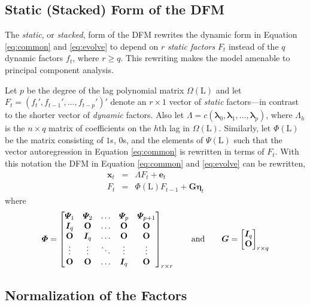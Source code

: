 \documentclass[12pt,twoside]{reedthesis}
\begin{document}
\hypertarget{static-stacked-form-of-the-dfm}{%
\subsection{Static (Stacked) Form of the DFM}\label{static-stacked-form-of-the-dfm}}

The \emph{static}, or \emph{stacked}, form of the DFM rewrites the dynamic form in Equation \eqref{eq:common} and \eqref{eq:evolve} to depend on \(r\) \emph{static factors} \(F_{t}\) instead of the \(q\) dynamic factors \(f_{t}\), where \(r \geq q\). This rewriting makes the model amenable to principal component analysis.

Let \(p\) be the degree of the lag polynomial matrix \(\bm \varOmega(\ensuremath{\mathrm{L}})\) and let \(F_{t} = (f_{t}', f_{t - 1}', \ldots, f_{t - p}')'\) denote an \(r \times 1\) vector of \emph{static} factors---in contrast to the shorter vector of \emph{dynamic} factors. Also let \(\bm \varLambda= c(\bm \lambda_{0}, \bm \lambda_{1}, \ldots, \bm \lambda_{p})\), where \(\bm \varLambda_{h}\) is the \(n \times q\) matrix of coefficients on the \(h\)th lag in \(\bm \varOmega(\ensuremath{\mathrm{L}})\). Similarly, let \(\bm \varPhi(\ensuremath{\mathrm{L}})\) be the matrix consisting of \(1\)s, \(0\)s, and the elements of \(\bm \varPsi(\ensuremath{\mathrm{L}})\) such that the vector autoregression in Equation \eqref{eq:common} is rewritten in terms of \(F_{t}\). With this notation the DFM in Equation \eqref{eq:common} and \eqref{eq:evolve} can be rewritten,
\begin{eqnarray}
  \bm x_{t} & = & \bm \varLambda F_{t} + \bm e_{t} \label{eq:common-stack}
  \\
  F_{t} & = & \bm \varPhi(\ensuremath{\mathrm{L}}) F_{t - 1} + \bm G\bm \eta_{t} \label{eq:evolve-stack} 
\end{eqnarray}
where
\begin{equation*}
  \bm \varPhi= 
  \begin{bmatrix}
    \bm \varPsi_{1} & \bm \varPsi_{2} & \ldots & \bm \varPsi_{p} & \bm \varPsi_{p + 1} \\
    \bm I_{q} & \mathbf{O} & \ldots & \mathbf{O} & \mathbf{O} \\
    \mathbf{O} & \bm I_{q} & \ldots & \mathbf{O} & \mathbf{O} \\
    \vdots & \vdots & \ddots & \vdots & \vdots \\
    \mathbf{O} & \mathbf{O} & \ldots & \bm I_{q} & \mathbf{O}
  \end{bmatrix}_{r \times r} \qquad
  \text{and} \qquad
  \bm G= 
  \begin{bmatrix}
    \bm I_{q} \\
    \mathbf{O}
  \end{bmatrix}_{r \times q}
\end{equation*}
\hypertarget{normalization-of-the-factors}{%
\subsection{Normalization of the Factors}\label{normalization-of-the-factors}}
\end{document}
